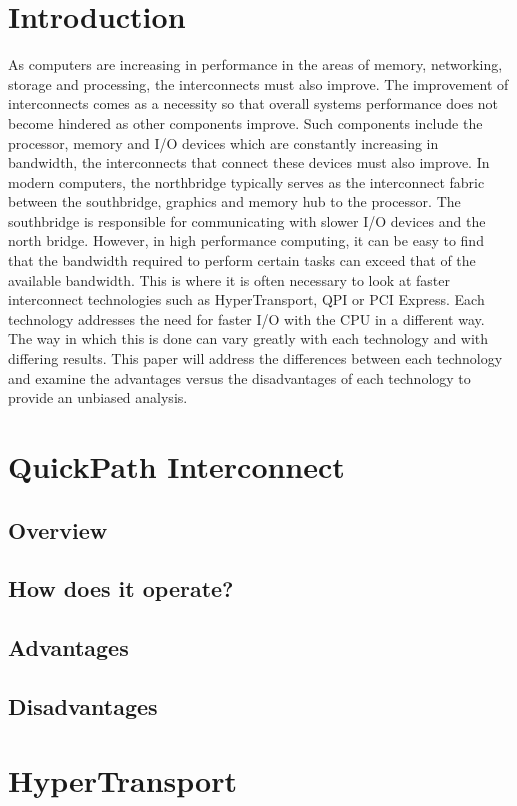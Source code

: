 \documentclass[conference]{IEEEtran}
\begin{document}
\section{Introduction}
\label{sec:intro}
As computers are increasing in performance in the areas of memory, networking,
storage and processing, the interconnects must also improve. The improvement of
interconnects comes as a necessity so that overall systems performance does not
become hindered as other components improve. Such components include the
processor, memory and I/O devices which are constantly increasing in bandwidth,
the interconnects that connect these devices must also improve. 
In modern computers, the northbridge typically serves as the interconnect fabric
between the southbridge, graphics and memory hub to the processor. The
southbridge is responsible for communicating with slower I/O devices and the
north bridge. However, in high performance computing, it can be easy to find
that the bandwidth required to perform certain tasks can exceed that of the
available bandwidth. This is where it is often necessary to look at faster
interconnect technologies such as HyperTransport, QPI or PCI Express. 
Each technology addresses the need for faster I/O with the CPU in a different
way. The way in which this is done can vary greatly with each technology and
with differing results. This paper will address the differences between each
technology and examine the advantages versus the disadvantages of each
technology to provide an unbiased analysis. 

\section{QuickPath Interconnect}
\subsection{Overview}
\subsection{How does it operate?}
\subsection{Advantages}
\subsection{Disadvantages}


\section{HyperTransport}
\label{sec:ht}
\end{document}
